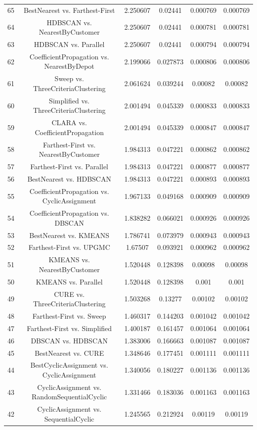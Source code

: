\documentclass[a4paper,10pt]{article}
\begin{document}
\begin{landscape}
\begin{table}[!htp]
\begin{tabular}{cccccc}
65&BestNearest vs. Farthest-First&2.250607&0.02441&0.000769&0.000769\\
64&HDBSCAN vs. NearestByCustomer&2.250607&0.02441&0.000781&0.000781\\
63&HDBSCAN vs. Parallel&2.250607&0.02441&0.000794&0.000794\\
62&CoefficientPropagation vs. NearestByDepot&2.199066&0.027873&0.000806&0.000806\\
61&Sweep vs. ThreeCriteriaClustering&2.061624&0.039244&0.00082&0.00082\\
60&Simplified vs. ThreeCriteriaClustering&2.001494&0.045339&0.000833&0.000833\\
59&CLARA vs. CoefficientPropagation&2.001494&0.045339&0.000847&0.000847\\
58&Farthest-First vs. NearestByCustomer&1.984313&0.047221&0.000862&0.000862\\
57&Farthest-First vs. Parallel&1.984313&0.047221&0.000877&0.000877\\
56&BestNearest vs. HDBSCAN&1.984313&0.047221&0.000893&0.000893\\
55&CoefficientPropagation vs. CyclicAssignment&1.967133&0.049168&0.000909&0.000909\\
54&CoefficientPropagation vs. DBSCAN&1.838282&0.066021&0.000926&0.000926\\
53&BestNearest vs. KMEANS&1.786741&0.073979&0.000943&0.000943\\
52&Farthest-First vs. UPGMC&1.67507&0.093921&0.000962&0.000962\\
51&KMEANS vs. NearestByCustomer&1.520448&0.128398&0.00098&0.00098\\
50&KMEANS vs. Parallel&1.520448&0.128398&0.001&0.001\\
49&CURE vs. ThreeCriteriaClustering&1.503268&0.13277&0.00102&0.00102\\
48&Farthest-First vs. Sweep&1.460317&0.144203&0.001042&0.001042\\
47&Farthest-First vs. Simplified&1.400187&0.161457&0.001064&0.001064\\
46&DBSCAN vs. HDBSCAN&1.383006&0.166663&0.001087&0.001087\\
45&BestNearest vs. CURE&1.348646&0.177451&0.001111&0.001111\\
44&BestCyclicAssignment vs. CyclicAssignment&1.340056&0.180227&0.001136&0.001136\\
43&CyclicAssignment vs. RandomSequentialCyclic&1.331466&0.183036&0.001163&0.001163\\
42&CyclicAssignment vs. SequentialCyclic&1.245565&0.212924&0.00119&0.00119\\

\end{tabular}
\end{table}
\end{landscape}
\end{document}
